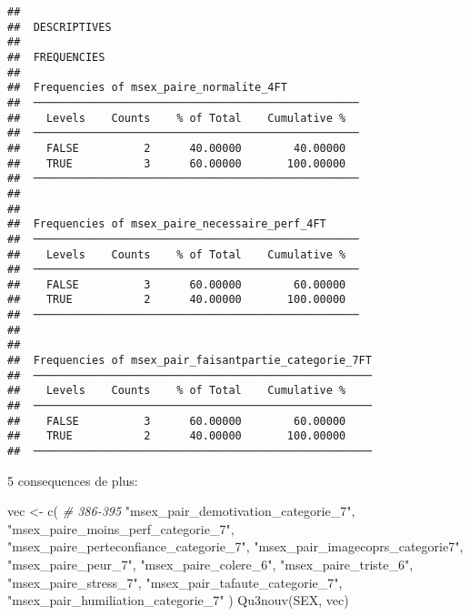 \documentclass[
]{article}
\newenvironment{Shaded}{\begin{snugshade}}{\end{snugshade}}
\newcommand{\CommentTok}[1]{\textcolor[rgb]{0.56,0.35,0.01}{\textit{#1}}}
\newcommand{\FunctionTok}[1]{\textcolor[rgb]{0.00,0.00,0.00}{#1}}
\newcommand{\NormalTok}[1]{#1}
\newcommand{\OtherTok}[1]{\textcolor[rgb]{0.56,0.35,0.01}{#1}}
\newcommand{\StringTok}[1]{\textcolor[rgb]{0.31,0.60,0.02}{#1}}
\begin{document}
\begin{verbatim}
## 
##  DESCRIPTIVES
## 
##  FREQUENCIES
## 
##  Frequencies of msex_paire_normalite_4FT            
##  ────────────────────────────────────────────────── 
##    Levels    Counts    % of Total    Cumulative %   
##  ────────────────────────────────────────────────── 
##    FALSE          2      40.00000        40.00000   
##    TRUE           3      60.00000       100.00000   
##  ────────────────────────────────────────────────── 
## 
## 
##  Frequencies of msex_paire_necessaire_perf_4FT      
##  ────────────────────────────────────────────────── 
##    Levels    Counts    % of Total    Cumulative %   
##  ────────────────────────────────────────────────── 
##    FALSE          3      60.00000        60.00000   
##    TRUE           2      40.00000       100.00000   
##  ────────────────────────────────────────────────── 
## 
## 
##  Frequencies of msex_pair_faisantpartie_categorie_7FT 
##  ──────────────────────────────────────────────────── 
##    Levels    Counts    % of Total    Cumulative %   
##  ──────────────────────────────────────────────────── 
##    FALSE          3      60.00000        60.00000   
##    TRUE           2      40.00000       100.00000   
##  ────────────────────────────────────────────────────
\end{verbatim}

5 consequences de plus:

\begin{Shaded}
\begin{Highlighting}[]
\NormalTok{vec }\OtherTok{\textless{}{-}} \FunctionTok{c}\NormalTok{(  }\CommentTok{\# 386{-}395}
  \StringTok{"msex\_pair\_demotivation\_categorie\_7"}\NormalTok{,}
  \StringTok{"msex\_paire\_moins\_perf\_categorie\_7"}\NormalTok{,}
  \StringTok{"msex\_paire\_perteconfiance\_categorie\_7"}\NormalTok{,}
  \StringTok{"msex\_pair\_imagecoprs\_categorie7"}\NormalTok{,}
  \StringTok{"msex\_paire\_peur\_7"}\NormalTok{,}
  \StringTok{"msex\_paire\_colere\_6"}\NormalTok{,}
  \StringTok{"msex\_paire\_triste\_6"}\NormalTok{,}
  \StringTok{"msex\_paire\_stress\_7"}\NormalTok{,}
  \StringTok{"msex\_pair\_tafaute\_categorie\_7"}\NormalTok{,}
  \StringTok{"msex\_pair\_humiliation\_categorie\_7"}
\NormalTok{  )}
\FunctionTok{Qu3nouv}\NormalTok{(SEX, vec)}
\end{Highlighting}
\end{Shaded}
\end{document}
